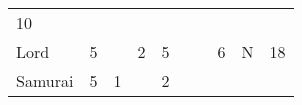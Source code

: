 \documentclass[12pt]{article}
\begin{document}
\begin{longtable}[]{@{}llllllllll@{}}
\begin{minipage}[t]{0.08\columnwidth}\raggedright\strut
10
\strut\end{minipage}\tabularnewline
\begin{minipage}[t]{0.13\columnwidth}\raggedright\strut
Lord
\strut\end{minipage} &
\begin{minipage}[t]{0.06\columnwidth}\raggedright\strut
5
\strut\end{minipage} &
\begin{minipage}[t]{0.06\columnwidth}\raggedright\strut
\strut\end{minipage} &
\begin{minipage}[t]{0.06\columnwidth}\raggedright\strut
2
\strut\end{minipage} &
\begin{minipage}[t]{0.06\columnwidth}\raggedright\strut
5
\strut\end{minipage} &
\begin{minipage}[t]{0.06\columnwidth}\raggedright\strut
\strut\end{minipage} &
\begin{minipage}[t]{0.06\columnwidth}\raggedright\strut
\strut\end{minipage} &
\begin{minipage}[t]{0.06\columnwidth}\raggedright\strut
6
\strut\end{minipage} &
\begin{minipage}[t]{0.07\columnwidth}\raggedright\strut
N
\strut\end{minipage} &
\begin{minipage}[t]{0.08\columnwidth}\raggedright\strut
18
\strut\end{minipage}\tabularnewline
\begin{minipage}[t]{0.13\columnwidth}\raggedright\strut
Samurai
\strut\end{minipage} &
\begin{minipage}[t]{0.06\columnwidth}\raggedright\strut
5
\strut\end{minipage} &
\begin{minipage}[t]{0.06\columnwidth}\raggedright\strut
1
\strut\end{minipage} &
\begin{minipage}[t]{0.06\columnwidth}\raggedright\strut
\strut\end{minipage} &
\begin{minipage}[t]{0.06\columnwidth}\raggedright\strut
2
\strut\end{minipage} &

\end{longtable}
\end{document}
